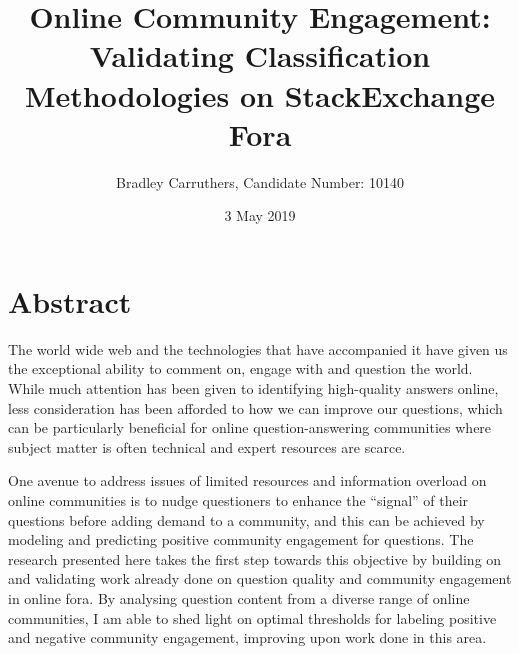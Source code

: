 \documentclass[12pt,preprint, authoryear]{article}
\title{Online Community Engagement: Validating Classification Methodologies on
StackExchange Fora}
\author{Bradley Carruthers, Candidate Number: 10140}
\date{3 May 2019}
\numberwithin{equation}{section}
\numberwithin{figure}{section}
\numberwithin{table}{section}
\begin{document}
\pagestyle{fancy}
\chead{}
\rhead{}
\lfoot{}
\rfoot{} 
\lhead{}
\cfoot{\footnotesize \thepage\\}





\maketitle
\thispagestyle{empty}



\clearpage

\setcounter{page}{1}

\section*{Abstract}

The world wide web and the technologies that have accompanied it have
given us the exceptional ability to comment on, engage with and question
the world. While much attention has been given to identifying
high-quality answers online, less consideration has been afforded to how
we can improve our questions, which can be particularly beneficial for
online question-answering communities where subject matter is often
technical and expert resources are scarce.

One avenue to address issues of limited resources and information
overload on online communities is to nudge questioners to enhance the
``signal'' of their questions before adding demand to a community, and
this can be achieved by modeling and predicting positive community
engagement for questions. The research presented here takes the first
step towards this objective by building on and validating work already
done on question quality and community engagement in online fora. By
analysing question content from a diverse range of online communities, I
am able to shed light on optimal thresholds for labeling positive and
negative community engagement, improving upon work done in this area.
\end{document}
